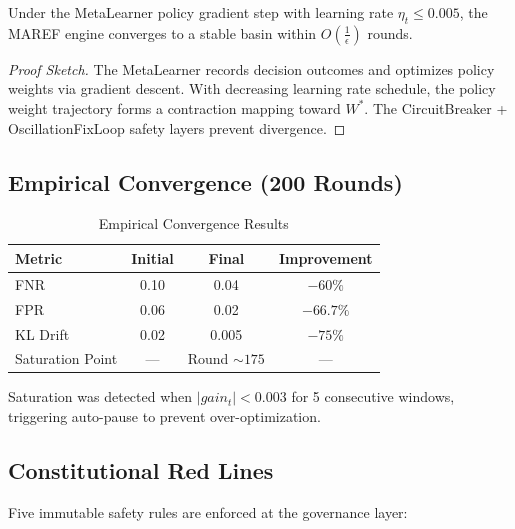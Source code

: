 \documentclass[11pt,a4paper]{article}
\begin{document}
\begin{theorem}[Convergence]
Under the MetaLearner policy gradient step with learning rate $\eta_t \leq 0.005$, the MAREF engine converges to a stable basin within $O(\frac{1}{\epsilon})$ rounds.
\end{theorem}

\begin{proof}[Proof Sketch]
The MetaLearner records decision outcomes and optimizes policy weights via gradient descent. With decreasing learning rate schedule, the policy weight trajectory forms a contraction mapping toward $W^*$. The CircuitBreaker + OscillationFixLoop safety layers prevent divergence.
\end{proof}

\subsection{Empirical Convergence (200 Rounds)}

\begin{table}[ht]
\centering
\caption{Empirical Convergence Results}
\label{tab:convergence}
\begin{tabular}{lccc}
\toprule
Metric & Initial & Final & Improvement \\
\midrule
FNR & 0.10 & 0.04 & $-60\%$ \\
FPR & 0.06 & 0.02 & $-66.7\%$ \\
KL Drift & 0.02 & 0.005 & $-75\%$ \\
Saturation Point & --- & Round $\sim 175$ & --- \\
\bottomrule
\end{tabular}
\end{table}

Saturation was detected when $|gain_t| < 0.003$ for 5 consecutive windows, triggering auto-pause to prevent over-optimization.

\subsection{Constitutional Red Lines}

Five immutable safety rules are enforced at the governance layer:
\end{document}
